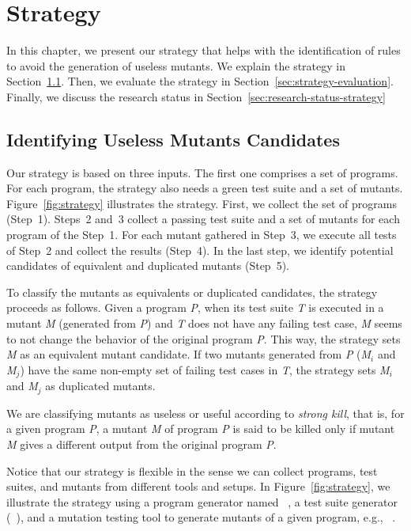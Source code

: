 \chapter{Strategy}
\label{sec:strategy}

In this chapter, we present our strategy that helps with the identification of rules to avoid the generation of useless mutants. 
We explain the strategy in Section~\ref{sec:strategy-identifying}. 
Then, we evaluate the strategy in Section~\ref{sec:strategy-evaluation}.
Finally, we discuss the research status in Section~\ref{sec:research-status-strategy}


\section{Identifying Useless Mutants Candidates}

\label{sec:strategy-identifying}

Our strategy is based on three inputs. 
The first one comprises a set of programs. 
For each program, the strategy also needs a green test suite and a set of mutants. 
Figure~\ref{fig:strategy} illustrates the strategy. 
First, we collect the set of programs (Step~1). 
Steps~2 and~3 collect a passing test suite and a set of mutants for each program of the Step~1. 
For each mutant gathered in Step~3, we execute all tests of Step~2 and collect the results (Step~4). 
In the last step, we identify potential candidates of equivalent and duplicated mutants (Step~5).

To classify the mutants as equivalents or duplicated candidates, the strategy proceeds as follows. 
Given a program \textit{P}, when its test suite \textit{T} is executed in a mutant \textit{M} (generated from \textit{P}) and \textit{T} does not have any failing test case, \textit{M} seems to not change the behavior of the original program \textit{P}. 
This way, the strategy sets \textit{M} as an equivalent mutant candidate. 
If two mutants generated from \textit{P} (\textit{M$_i$} and \textit{M$_j$}) have the same non-empty set of failing test cases in \textit{T}, the strategy sets \textit{M$_i$} and \textit{M$_j$} as duplicated mutants.

We are classifying mutants as useless or useful according to \textit{strong kill}, that is, for a given program \textit{P}, a mutant \textit{M} of program \textit{P} is said to be killed only if mutant \textit{M} gives a different output from the original program \textit{P}.

Notice that our strategy is flexible in the sense we can collect programs, test suites, and mutants from different tools and setups. 
In Figure~\ref{fig:strategy}, we illustrate the strategy using a program generator named \jdolly{}~\cite{SOARES:2013:1}, a test suite generator (\randoop{}~\cite{PACHECO:2007:1}), and a mutation testing tool to generate mutants of a given program, e.g., \pit{}~\cite{PIT:2017}.

